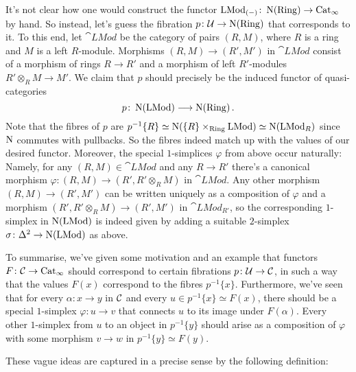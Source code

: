 \begin{numpar}
	It's not clear how one would construct the functor $\mathrm{LMod}_{(-)}\colon \operatorname{N}(\mathrm{Ring})\rightarrow \mathrm{Cat}_\infty$ by hand. So instead, let's guess the fibration $p\colon \mathcal{U}\rightarrow \operatorname{N}(\mathrm{Ring})$ that corresponds to it. To this end, let $\cat{LMod}$ be the category of pairs $(R,M)$, where $R$ is a ring and $M$ is a left $R$-module. Morphisms $(R,M)\rightarrow (R',M')$ in $\cat{LMod}$ consist of a morphism of rings $R\rightarrow R'$ and a morphism of left $R'$-modules $R'\otimes_RM\rightarrow M'$. We claim that $p$ should precisely be the induced functor of quasi-categories
	\begin{equation*}
		p\colon \operatorname{N}(\mathrm{LMod})\longrightarrow \operatorname{N}(\mathrm{Ring})\,.
	\end{equation*}
	Note that the fibres of $p$ are $p^{-1}\{R\}\simeq \operatorname{N}(\{R\}\times_{\mathrm{Ring}}\mathrm{LMod})\simeq \operatorname{N}(\mathrm{LMod}_R)$ since $\operatorname{N}$ commutes with pullbacks. So the fibres indeed match up with the values of our desired functor. Moreover, the special $1$-simplices $\varphi$ from above occur naturally: Namely, for any $(R,M)\in\cat{LMod}$ and any $R\rightarrow R'$ there's a canonical morphism $\varphi\colon (R,M)\rightarrow (R',R'\otimes_RM)$ in $\cat{LMod}$. Any other morphism $(R,M)\rightarrow (R',M')$ can be written uniquely as a composition of $\varphi$ and a morphism $(R',R'\otimes_RM)\rightarrow (R',M')$ in $\cat{LMod}_{R'}$, so the corresponding $1$-simplex in $\operatorname{N}(\mathrm{LMod})$ is indeed given by adding a suitable $2$-simplex $\sigma\colon \Delta^2\rightarrow \operatorname{N}(\mathrm{LMod})$ as above.
	
	To summarise, we've given some motivation and an example that functors $F\colon \mathcal{C}\rightarrow\mathrm{Cat}_\infty$ should correspond to certain fibrations $p\colon \mathcal{U}\rightarrow \mathcal{C}$, in such a way that the values $F(x)$ correspond to the fibres $p^{-1}\{x\}$. Furthermore, we've seen that for every $\alpha\colon x\rightarrow y$ in $\mathcal{C}$ and every $u\in p^{-1}\{x\}\simeq F(x)$, there should be a special $1$-simplex $\varphi\colon u\rightarrow v$ that connects $u$ to its image under $F(\alpha)$. Every other $1$-simplex from $u$ to an object in $p^{-1}\{y\}$ should arise as a composition of $\varphi$ with some morphism $v\rightarrow w$ in $p^{-1}\{y\}\simeq F(y)$.
\end{numpar}

 These vague ideas are captured in a precise sense by the following definition:

